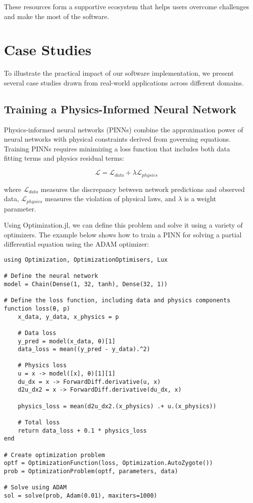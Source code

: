 These resources form a supportive ecosystem that helps users overcome challenges and make the most of the software.

\section{Case Studies}

To illustrate the practical impact of our software implementation, we present several case studies drawn from real-world applications across different domains.

\subsection{Training a Physics-Informed Neural Network}

Physics-informed neural networks (PINNs) combine the approximation power of neural networks with physical constraints derived from governing equations. Training PINNs requires minimizing a loss function that includes both data fitting terms and physics residual terms:

\begin{equation}
\mathcal{L} = \mathcal{L}_{data} + \lambda \mathcal{L}_{physics}
\end{equation}

where $\mathcal{L}_{data}$ measures the discrepancy between network predictions and observed data, $\mathcal{L}_{physics}$ measures the violation of physical laws, and $\lambda$ is a weight parameter.

Using Optimization.jl, we can define this problem and solve it using a variety of optimizers. The example below shows how to train a PINN for solving a partial differential equation using the ADAM optimizer:

\begin{verbatim}
using Optimization, OptimizationOptimisers, Lux

# Define the neural network
model = Chain(Dense(1, 32, tanh), Dense(32, 1))

# Define the loss function, including data and physics components
function loss(θ, p)
    x_data, y_data, x_physics = p
    
    # Data loss
    y_pred = model(x_data, θ)[1]
    data_loss = mean((y_pred - y_data).^2)
    
    # Physics loss
    u = x -> model([x], θ)[1][1]
    du_dx = x -> ForwardDiff.derivative(u, x)
    d2u_dx2 = x -> ForwardDiff.derivative(du_dx, x)
    
    physics_loss = mean(d2u_dx2.(x_physics) .+ u.(x_physics))
    
    # Total loss
    return data_loss + 0.1 * physics_loss
end

# Create optimization problem
optf = OptimizationFunction(loss, Optimization.AutoZygote())
prob = OptimizationProblem(optf, parameters, data)

# Solve using ADAM
sol = solve(prob, Adam(0.01), maxiters=1000)
\end{verbatim}

